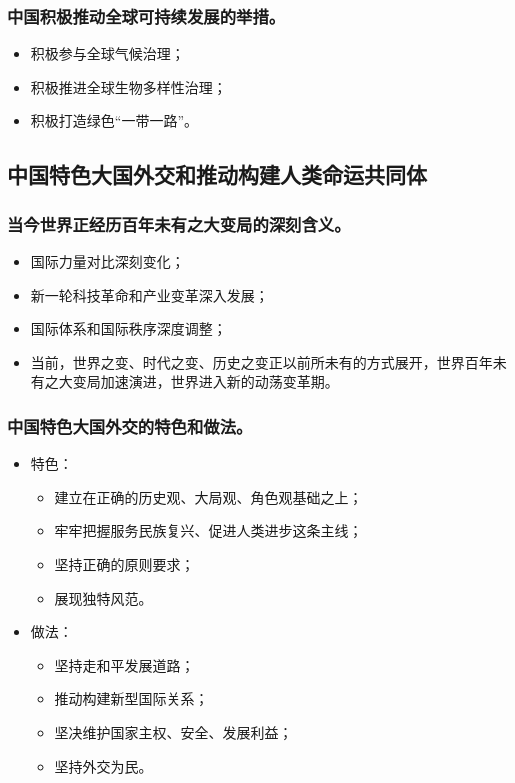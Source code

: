 \documentclass{article}
\begin{document}
\subsubsection{中国积极推动全球可持续发展的举措。}
\begin{itemize}
    \item 积极参与全球气候治理；
    \item 积极推进全球生物多样性治理；
    \item 积极打造绿色“一带一路”。
\end{itemize}

\subsection{中国特色大国外交和推动构建人类命运共同体}

\subsubsection{当今世界正经历百年未有之大变局的深刻含义。}
\begin{itemize}
    \item 国际力量对比深刻变化；
    \item 新一轮科技革命和产业变革深入发展；
    \item 国际体系和国际秩序深度调整；
    \item 当前，世界之变、时代之变、历史之变正以前所未有的方式展开，世界百年未有之大变局加速演进，世界进入新的动荡变革期。
\end{itemize}

\subsubsection{中国特色大国外交的特色和做法。}
\begin{itemize}
    \item 特色：
    \begin{itemize}
        \item 建立在正确的历史观、大局观、角色观基础之上；
        \item 牢牢把握服务民族复兴、促进人类进步这条主线；
        \item 坚持正确的原则要求；
        \item 展现独特风范。
    \end{itemize}
    \item 做法：
    \begin{itemize}
        \item 坚持走和平发展道路；
        \item 推动构建新型国际关系；
        \item 坚决维护国家主权、安全、发展利益；
        \item 坚持外交为民。
    \end{itemize}
\end{itemize}
\end{document}
